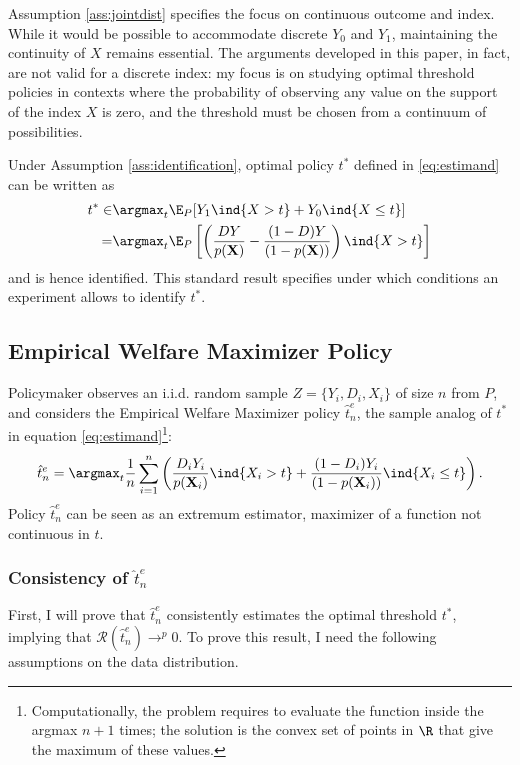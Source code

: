 {Assumption \ref{ass:jointdist} specifies the focus on continuous outcome and index. While it would be possible to accommodate discrete $Y_0$ and $Y_1$, maintaining the continuity of $X$ remains essential. The arguments developed in this paper, in fact, are not valid for a discrete index: my focus is on studying optimal threshold policies in contexts where the probability of observing any value on the support of the index $X$ is zero, and the threshold must be chosen from a continuum of possibilities. 

Under Assumption \ref{ass:identification}, optimal policy $t^*$ defined in \eqref{eq:estimand} can be written as
\begin{align}
    t^* \in & \argmax_{t} \E_P[Y_1\ind\{X> t\} + Y_0\ind\{X \leq t\}] \\
    = & \argmax_{t} \E_P\left[\left(\frac{D Y}{p(\textbf{X})} - \frac{(1-D) Y}{(1-p(\textbf{X}))} \right) \ind\{X > t\}\right]
\end{align}
and is hence identified. This standard result specifies under which conditions an experiment allows to identify $t^*$.

\subsection{Empirical Welfare Maximizer Policy}

Policymaker observes an i.i.d. random sample $Z=\{Y_i,D_i,X_i\}$ of size $n$ from $P$, and considers the Empirical Welfare Maximizer policy $\hat{t}^e_n$, the sample analog of $t^*$ in equation \eqref{eq:estimand}\footnote{Computationally, the problem requires to evaluate the function inside the argmax $n+1$ times; the solution is the convex set of points in $\R$ that give the maximum of these values.}:
\begin{gather} \label{eq:estimator}
\hat{t}^e_n=\argmax_{t} \frac{1}{n} \sum_{i=1}^n \left(\frac{D_i Y_i}{p(\textbf{X}_i)}\ind\{X_i > t\} + \frac{(1-D_i) Y_i}{(1-p(\textbf{X}_i))}\ind\{X_i \leq t\} \right).
\end{gather}
Policy $\hat{t}^e_n$ can be seen as an extremum estimator, maximizer of a function not continuous in $t$.

\subsubsection{Consistency of $\hat{t}^e_n$}

First, I will prove that $\hat{t}^e_n$ consistently estimates the optimal threshold $t^*$, implying that $\mathcal{R}(\hat{t}^e_n) \rightarrow ^p 0$. To prove this result, I need the following assumptions on the data distribution.

}
